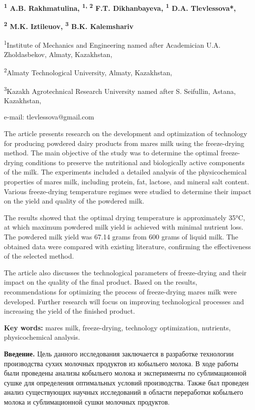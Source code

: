 {\bfseries \textsuperscript{1} A.B. Rakhmatulina, \textsuperscript{1, 2}
F.T. Dikhanbayeva, \textsuperscript{1} D.A. Tlevlessova*,}

{\bfseries \textsuperscript{2} M.K. Iztileuov, \textsuperscript{3} B.K.
Kalemshariv}

\textsuperscript{1}Institute of Mechanics and Engineering named after
Academician U.A. Zholdasbekov, Almaty, Kazakhstan,

\textsuperscript{2}Almaty Technological University, Almaty, Kazakhstan,

\textsuperscript{3}Kazakh Agrotechnical Research University named after
S. Seifullin, Astana, Kazakhstan,

e-mail: tlevlessova@gmail.com

The article presents research on the development and optimization of
technology for producing powdered dairy products from
mare\textquotesingle s milk using the freeze-drying method. The main
objective of the study was to determine the optimal freeze-drying
conditions to preserve the nutritional and biologically active
components of the milk. The experiments included a detailed analysis of
the physicochemical properties of mare\textquotesingle s milk, including
protein, fat, lactose, and mineral salt content. Various freeze-drying
temperature regimes were studied to determine their impact on the yield
and quality of the powdered milk.

The results showed that the optimal drying temperature is approximately
35°C, at which maximum powdered milk yield is achieved with minimal
nutrient loss. The powdered milk yield was 67.14 grams from 600 grams of
liquid milk. The obtained data were compared with existing literature,
confirming the effectiveness of the selected method.

The article also discusses the technological parameters of freeze-drying
and their impact on the quality of the final product. Based on the
results, recommendations for optimizing the process of freeze-drying
mare\textquotesingle s milk were developed. Further research will focus
on improving technological processes and increasing the yield of the
finished product.

{\bfseries Key words:} mare\textquotesingle s milk, freeze-drying,
technology optimization, nutrients, physicochemical analysis.

{\bfseries Введение.} Цель данного исследования заключается в разработке
технологии производства сухих молочных продуктов из кобыльего молока. В
ходе работы были проведены анализы кобыльего молока и эксперименты по
сублимационной сушке для определения оптимальных условий производства.
Также был проведен анализ существующих научных исследований в области
переработки кобыльего молока и сублимационной сушки молочных продуктов.

